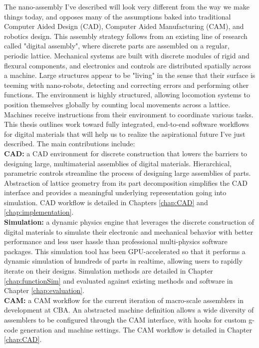 {The nano-assembly I've described will look very different from the way we make things today, and opposes many of the assumptions baked into traditional Computer Aided Design (CAD),  Computer Aided Manufacturing (CAM), and robotics design.  This assembly strategy follows from an existing line of research called "digital assembly", where discrete parts are assembled on a regular, periodic lattice.  Mechanical systems are built with discrete modules of rigid and flexural components, and electronics and controls are distributed spatially across a machine.  Large structures appear to be "living" in the sense that their surface is teeming with nano-robots, detecting and correcting errors and performing other functions.  The environment is highly structured, allowing locomotion systems to position themselves globally by counting local movements across a lattice.  Machines receive instructions from their environment to coordinate various tasks.
\\

This thesis outlines work toward fully integrated, end-to-end software workflows for digital materials that will help us to realize the aspirational future I've just described.  The main contributions include:\\

\textbf{CAD:} a CAD environment for discrete construction that lowers the barriers to designing large, multimaterial assemblies of digital materials.  Hierarchical, parametric controls streamline the process of designing large assemblies of parts.   Abstraction of lattice geometry from its part decomposition simplifies the CAD interface and provides a meaningful underlying representation going into simulation.  CAD workflow is detailed in Chapters \ref{chap:CAD} and \ref{chap:implementation}.\\

\textbf{Simulation:} a dynamic physics engine that leverages the discrete construction of digital materials to simulate their electronic and mechanical behavior with better performance and less user hassle than professional multi-physics software packages.  This simulation tool has been GPU-accelerated so that it performs a dynamic simulation of hundreds of parts in realtime, allowing users to rapidly iterate on their designs.  Simulation methods are detailed in Chapter \ref{chap:functionSim} and evaluated against existing methods and software in Chapter \ref{chap:evaluation}.\\

\textbf{CAM:} a CAM workflow for the current iteration of macro-scale assemblers in development at CBA.  An abstracted machine definition allows a wide diversity of assemblers to be configured through the CAM interface, with hooks for custom g-code generation and machine settings.  The CAM workflow is detailed in Chapter \ref{chap:CAD}.\\

}
